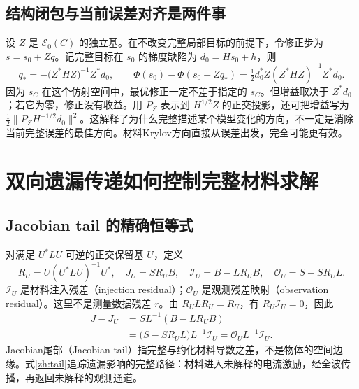 \subsection{结构闭包与当前误差对齐是两件事}
设 $Z$ 是 $\mathcal E_0(C)$ 的独立基。在不改变完整局部目标的前提下，令修正步为 $s=s_0+Zq$。记完整目标在 $s_0$ 的梯度缺陷为 $d_0=Hs_0+h$，则
\begin{equation}
 q_*=-\bigl(Z^*HZ\bigr)^{-1}Z^*d_0,
 \qquad
 \Phi(s_0)-\Phi(s_0+Zq_*)
 =\tfrac12 d_0^*Z(Z^*HZ)^{-1}Z^*d_0.
\end{equation}
因为 $s_C$ 在这个仿射空间中，最优修正一定不差于指定的 $s_C$。但增益取决于 $Z^*d_0$；若它为零，修正没有收益。用 $P_Z$ 表示到 $H^{1/2}Z$ 的正交投影，还可把增益写为 $\tfrac12\|P_ZH^{-1/2}d_0\|^2$。这解释了为什么完整描述某个模型变化的方向，不一定是消除当前完整误差的最佳方向。材料Krylov方向直接从误差出发，完全可能更有效。

\section{双向遗漏传递如何控制完整材料求解}
\subsection{Jacobian tail 的精确恒等式}
对满足 $U^*LU$ 可逆的正交保留基 $U$，定义
\begin{equation}
 R_U=U(U^*LU)^{-1}U^*,\quad J_U=SR_UB,
 \quad\mathcal I_U=B-LR_UB,\quad\mathcal O_U=S-SR_UL.
\end{equation}
$\mathcal I_U$ 是材料注入残差（injection residual）；$\mathcal O_U$ 是观测残差映射（observation residual）。这里不是测量数据残差 $r$。由 $R_ULR_U=R_U$，有 $R_U\mathcal I_U=0$，因此
\begin{equation}\label{zh:tail}
 \begin{aligned}
 J-J_U&=SL^{-1}(B-LR_UB)\\
 &=\bigl(S-SR_UL\bigr)L^{-1}\mathcal I_U
 =\boxed{\mathcal O_UL^{-1}\mathcal I_U}.
 \end{aligned}
\end{equation}
Jacobian尾部（Jacobian tail）指完整与约化材料导数之差，不是物体的空间边缘。式\eqref{zh:tail}追踪遗漏影响的完整路径：材料进入未解释的电流激励，经全波传播，再返回未解释的观测通道。


